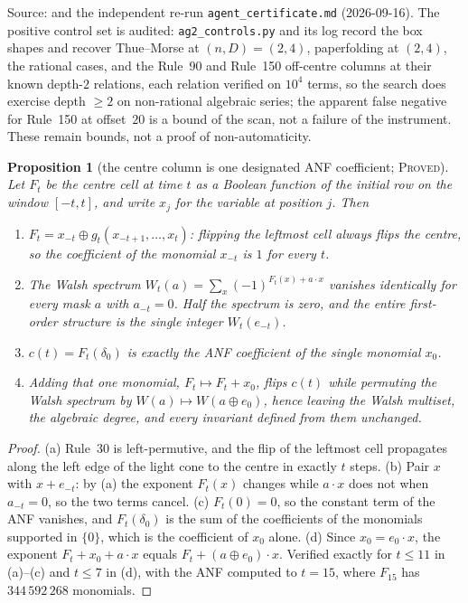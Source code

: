 \documentclass[11pt]{article}
\newtheorem{proposition}[theorem]{Proposition}
\theoremstyle{definition}
\theoremstyle{remark}
\newcommand{\PROVED}{\textsc{Proved}}
\begin{document}
\noindent Source: \cite{Auto} and the independent re-run \texttt{agent\_certificate.md} (2026-09-16). The positive control set is audited: \texttt{ag2\_controls.py} and its log record the box shapes and recover Thue--Morse at $(n,D)=(2,4)$, paperfolding at $(2,4)$, the rational cases, and the Rule~90 and Rule~150 off-centre columns at their known depth-$2$ relations, each relation verified on $10^4$ terms, so the search does exercise depth $\ge2$ on non-rational algebraic series; the apparent false negative for Rule~150 at offset~$20$ is a bound of the scan, not a failure of the instrument. These remain bounds, not a proof of non-automaticity.

\begin{proposition}[the centre column is one designated ANF coefficient; \PROVED]\label{du:anf}
Let $F_t$ be the centre cell at time $t$ as a Boolean function of the initial row on the window
$[-t,t]$, and write $x_j$ for the variable at position $j$. Then
\begin{enumerate}[nosep]
\item[(a)] $F_t=x_{-t}\oplus g_t(x_{-t+1},\dots,x_{t})$: flipping the leftmost cell always flips the
centre, so the coefficient of the monomial $x_{-t}$ is $1$ for every $t$.
\item[(b)] The Walsh spectrum $W_t(a)=\sum_x(-1)^{F_t(x)+a\cdot x}$ vanishes identically for every mask
$a$ with $a_{-t}=0$. Half the spectrum is zero, and the entire first-order structure is the single
integer $W_t(e_{-t})$.
\item[(c)] $c(t)=F_t(\delta_0)$ is exactly the ANF coefficient of the single monomial $x_0$.
\item[(d)] Adding that one monomial, $F_t\mapsto F_t+x_0$, flips $c(t)$ while permuting the Walsh
spectrum by $W(a)\mapsto W(a\oplus e_0)$, hence leaving the Walsh \emph{multiset}, the algebraic
degree, and every invariant defined from them unchanged.
\end{enumerate}
\end{proposition}
\begin{proof}
(a) Rule~30 is left-permutive, and the flip of the leftmost cell propagates along the left edge of the
light cone to the centre in exactly $t$ steps. (b) Pair $x$ with $x+e_{-t}$: by (a) the exponent
$F_t(x)$ changes while $a\cdot x$ does not when $a_{-t}=0$, so the two terms cancel. (c) $F_t(0)=0$, so
the constant term of the ANF vanishes, and $F_t(\delta_0)$ is the sum of the coefficients of the
monomials supported in $\{0\}$, which is the coefficient of $x_0$ alone. (d) Since $x_0=e_0\cdot x$, the
exponent $F_t+x_0+a\cdot x$ equals $F_t+(a\oplus e_0)\cdot x$. Verified exactly for $t\le11$ in (a)--(c)
and $t\le7$ in (d), with the ANF computed to $t=15$, where $F_{15}$ has $344\,592\,268$ monomials.
\end{proof}
\end{document}

